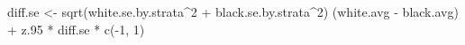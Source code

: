 \documentclass[11pt,]{article}
\newenvironment{Shaded}{\begin{snugshade}}{\end{snugshade}}
\newcommand{\DecValTok}[1]{\textcolor[rgb]{0.00,0.00,0.81}{#1}}
\newcommand{\FloatTok}[1]{\textcolor[rgb]{0.00,0.00,0.81}{#1}}
\newcommand{\FunctionTok}[1]{\textcolor[rgb]{0.00,0.00,0.00}{#1}}
\newcommand{\NormalTok}[1]{#1}
\newcommand{\OtherTok}[1]{\textcolor[rgb]{0.56,0.35,0.01}{#1}}
\newcommand{\SpecialCharTok}[1]{\textcolor[rgb]{0.00,0.00,0.00}{#1}}
\begin{document}
\begin{Shaded}
\begin{Highlighting}[]
\NormalTok{diff.se }\OtherTok{\textless{}{-}} \FunctionTok{sqrt}\NormalTok{(white.se.by.strata}\SpecialCharTok{\^{}}\DecValTok{2} \SpecialCharTok{+}\NormalTok{ black.se.by.strata}\SpecialCharTok{\^{}}\DecValTok{2}\NormalTok{)}
\NormalTok{(white.avg }\SpecialCharTok{{-}}\NormalTok{ black.avg) }\SpecialCharTok{+}\NormalTok{ z}\FloatTok{.95} \SpecialCharTok{*}\NormalTok{ diff.se }\SpecialCharTok{*} \FunctionTok{c}\NormalTok{(}\SpecialCharTok{{-}}\DecValTok{1}\NormalTok{, }\DecValTok{1}\NormalTok{)}
\end{Highlighting}
\end{Shaded}






\newpage
\singlespacing 
\end{document}
